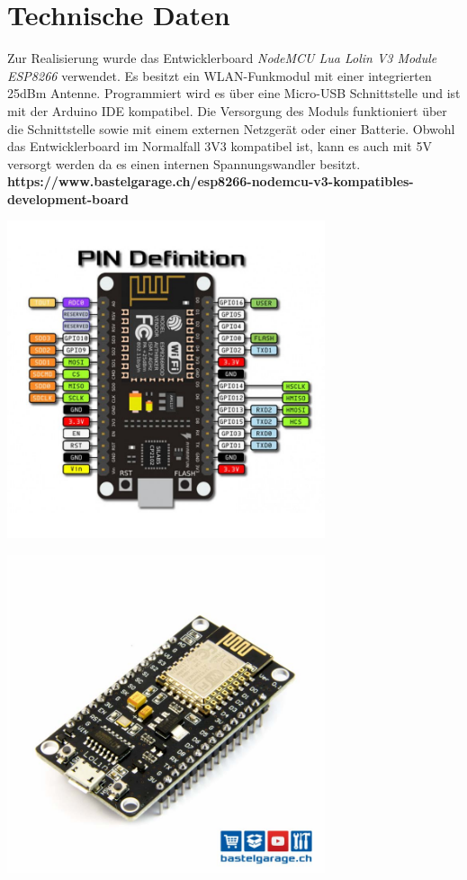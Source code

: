 \documentclass[paper=a4, 12pt]{scrreprt}
\begin{document}
\section{Technische Daten}
Zur Realisierung wurde das Entwicklerboard \textit{NodeMCU Lua Lolin V3 Module ESP8266} verwendet. Es besitzt ein WLAN-Funkmodul mit einer integrierten 25dBm Antenne.
Programmiert wird es über eine Micro-USB Schnittstelle und ist mit der Arduino IDE kompatibel. Die Versorgung des Moduls funktioniert über die Schnittstelle sowie mit einem externen Netzgerät oder einer Batterie. Obwohl das Entwicklerboard im Normalfall 3V3 kompatibel ist, kann es auch mit 5V versorgt werden da es einen internen Spannungswandler besitzt. \textbf{https://www.bastelgarage.ch/esp8266-nodemcu-v3-kompatibles-development-board}

\begin{center}
\begin{minipage}{0.5\textwidth}
\includegraphics[width=0.7\textwidth]{ESP_pining.jpg} 
\end{minipage}\hfill%
\begin{minipage}{0.5\textwidth}
\includegraphics[width=0.7\textwidth]{Entwicklerboard.jpg} 
\end{minipage}
\end{center}
\end{document}

